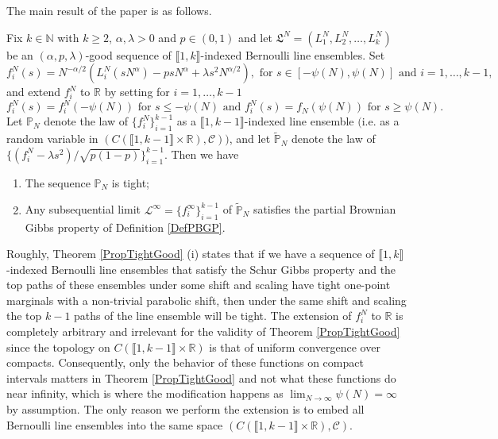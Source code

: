 The main result of the paper is as follows.
\begin{theorem}\label{PropTightGood}
Fix $k \in \mathbb{N}$ with $k \geq 2$, $\alpha, \lambda > 0$ and $p \in (0,1)$ and let $\mathfrak{L}^N = (L^N_1, L^N_2, \dots, L^N_k)$ be an $(\alpha, p, \lambda)$-good sequence of $\llbracket 1, k \rrbracket$-indexed Bernoulli line ensembles.  Set
$$f^N_i(s) =  N^{-\alpha/2}(L^N_i(sN^{\alpha}) - p s N^{\alpha} + \lambda s^2 N^{\alpha/2}), \mbox{ for $s\in [-\psi(N) ,\psi(N)]$ and $i = 1,\dots, k -1$,}$$
and extend $f^N_i$ to $\mathbb{R}$ by setting for $i = 1, \dots, k - 1$
$$f^N_i(s) = f^N_i(-\psi(N)) \mbox{ for $s \leq -\psi(N)$ and } f^N_i(s) = f_N(\psi(N)) \mbox{ for $s \geq \psi(N)$}.$$
Let $\mathbb{P}_N$ denote the law of $\{f^N_i\}_{i = 1}^{k-1}$ as a $\llbracket 1, k-1 \rrbracket$-indexed line ensemble $\mathrm{(}$i.e. as a random variable in $(C( \llbracket 1, k -1 \rrbracket \times \mathbb{R}), \mathcal{C}))$, and let $\tilde{\mathbb{P}}_N$ denote the law of $\{(f_i^N - \lambda s^2)/\sqrt{p(1-p)}\}_{i=1}^{k-1}$. Then we have 
\begin{enumerate}[label=(\roman*)]
	\item The sequence $\mathbb{P}_N$ is tight; 
	
	\item Any subsequential limit $\mathcal{L}^\infty = \{f_i^{\infty}\}_{i = 1}^{k-1}$ of $\tilde{\mathbb{P}}_N$ satisfies the partial Brownian Gibbs property of Definition \ref{DefPBGP}.
\end{enumerate}
\end{theorem}

Roughly, Theorem \ref{PropTightGood} (i) states that if we have a sequence of $\llbracket 1, k \rrbracket$-indexed Bernoulli line ensembles that satisfy the Schur Gibbs property and the top paths of these ensembles under some shift and scaling have tight one-point marginals with a non-trivial parabolic shift, then  under the same shift and scaling the top $k-1$ paths of the line ensemble will be tight. The extension of $f^N_i$ to $\mathbb{R}$ is completely arbitrary and irrelevant for the validity of Theorem \ref{PropTightGood} since the topology on $C( \llbracket 1, k -1 \rrbracket \times \mathbb{R})$ is that of uniform convergence over compacts. Consequently, only the behavior of these functions on compact intervals matters in Theorem \ref{PropTightGood} and not what these functions do near infinity, which is where the modification happens as $\lim_{N \rightarrow \infty} \psi(N) = \infty$  by assumption. The only reason we perform the extension is to embed all Bernoulli line ensembles into the same space $(C( \llbracket 1, k -1 \rrbracket \times \mathbb{R}), \mathcal{C})$.

